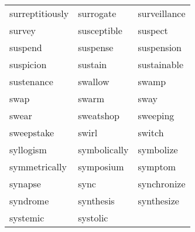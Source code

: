 \documentclass{minimal}
\begin{document}
\begin{longtable}{p{2.7cm}@{\hskip 0.2cm}p{2.7cm}@{\hskip 0.2cm}p{2.7cm}}
surreptitiously & surrogate & surveillance \\
survey & susceptible & suspect \\
suspend & suspense & suspension \\
suspicion & sustain & sustainable \\
sustenance & swallow & swamp \\
swap & swarm & sway \\
swear & sweatshop & sweeping \\
sweepstake & swirl & switch \\
syllogism & symbolically & symbolize \\
symmetrically & symposium & symptom \\
synapse & sync & synchronize \\
syndrome & synthesis & synthesize \\
systemic & systolic
\end{longtable}
\end{document}
